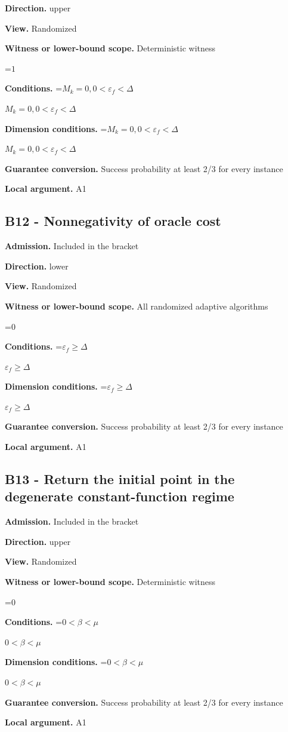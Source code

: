 \documentclass[10pt,a4paper]{article}
\newcommand{\AtlasMath}[1]{\par\begingroup\centering\setbox0=\hbox{$\displaystyle #1$}\ifdim\wd0>1.4\linewidth\typeout{ATLAS WIDE FORMULA: \the\wd0}\fi\ifdim\wd0>\linewidth\resizebox{\linewidth}{!}{\box0}\else\box0\fi\par\endgroup}
\newcommand{\AtlasInlineMath}[1]{\begingroup\setbox0=\hbox{$#1$}\ifdim\wd0>.4\linewidth\endgroup\AtlasMath{#1}\else\endgroup$#1$\fi}
\begin{document}
\textbf{Direction.} upper

\textbf{View.} Randomized

\textbf{Witness or lower-bound scope.} Deterministic witness

\AtlasMath{1}
\textbf{Conditions.} \AtlasInlineMath{M_k=0,0<\varepsilon_f<\Delta}

\textbf{Dimension conditions.} \AtlasInlineMath{M_k=0,0<\varepsilon_f<\Delta}

\textbf{Guarantee conversion.} Success probability at least 2/3 for every instance

\textbf{Local argument.} A1

\subsection{B12 - Nonnegativity of oracle cost}
\textbf{Admission.} Included in the bracket

\textbf{Direction.} lower

\textbf{View.} Randomized

\textbf{Witness or lower-bound scope.} All randomized adaptive algorithms

\AtlasMath{0}
\textbf{Conditions.} \AtlasInlineMath{\varepsilon_f\ge \Delta}

\textbf{Dimension conditions.} \AtlasInlineMath{\varepsilon_f\ge \Delta}

\textbf{Guarantee conversion.} Success probability at least 2/3 for every instance

\textbf{Local argument.} A1

\subsection{B13 - Return the initial point in the degenerate constant-function regime}
\textbf{Admission.} Included in the bracket

\textbf{Direction.} upper

\textbf{View.} Randomized

\textbf{Witness or lower-bound scope.} Deterministic witness

\AtlasMath{0}
\textbf{Conditions.} \AtlasInlineMath{0<\beta<\mu}

\textbf{Dimension conditions.} \AtlasInlineMath{0<\beta<\mu}

\textbf{Guarantee conversion.} Success probability at least 2/3 for every instance

\textbf{Local argument.} A1
\end{document}
